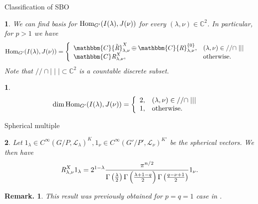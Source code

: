 \documentclass[8pt,notes,notheorems]{beamer}
\newcommand{\Hom}{\mbox{\normalfont Hom}}
\newcommand{\OpR}{\mbox{\it R}}
\newtheorem{theorem}{\translate{Theorem}}[section]
\newtheorem{theorem}{\translate{Theorem}}
\newtheorem{corollary}{\translate{Corollary}}
\theoremstyle{definition}
\theoremstyle{example}
\theoremstyle{plain}
\theoremstyle{mystyle}
\newtheorem*{remark}{Remark.}
\begin{document}
\begin{frame}{Classification of SBO}
	\begin{theorem}
		We can find basis for $\Hom_{G'}(I(\lambda),J(\nu))$ for every $(\lambda,\nu)\in \mathbb{C}^2$. In particular, for $p>1$ we have
  \begin{eqnarray}
	  & \Hom_{G'}(I(\lambda),J(\nu))= \left\{
    \begin{array}{ll}
	    \mathbbm{C} {\tilde{\OpR}}_{\lambda, \nu}^{X} \oplus \mathbbm{C}
      {\OpR}^{\{ 0 \}}_{\lambda, \nu}, & (\lambda, \nu) \in / /\cap 
      \mid\mid\mid \\
      \mathbbm{C} \OpR^X_{\lambda, \nu}, &
      \mbox{\normalfont otherwise.}
    \end{array} \right. &  \nonumber
  \end{eqnarray}
  Note that $//\cap\mid\mid\mid\subset\mathbb{C}^2$ is a countable discrete subset.
		\label{}
	\end{theorem}
	\begin{corollary}
  \begin{eqnarray}
	  & \dim\Hom_{G'}(I(\lambda),J(\nu))= \left\{
    \begin{array}{ll}
	    2, & (\lambda, \nu) \in / /\cap 
      \mid\mid\mid \\
      1, &
      \mbox{\normalfont otherwise.}
    \end{array} \right. &  \nonumber
  \end{eqnarray}
	\end{corollary}
\end{frame}
\begin{frame}{Spherical multiple}
	\begin{theorem}
		Let $1_\lambda\in C^\infty(G/P,\mathcal{L}_\lambda)^K,1_\nu\in C^\infty(G'/P',\mathcal{L}_\nu)^{K'}$ be the spherical vectors. We then have
	\[ \OpR^X_{\lambda, \nu} 1_{\lambda} = 2^{1 -
     \lambda} \frac{\pi^{n / 2}}{\Gamma \left( \frac{\lambda}{2} \right)
     \Gamma \left(  \frac{\lambda + 1-q}{2} \right) \Gamma \left(
     \frac{q - \nu + 1}{2} \right)} 1_{\nu}. \]
	\end{theorem}
	\begin{remark}
		This result was previously obtained for $p=q=1$ case in \cite{bernstein2004estimates}.
	\end{remark}
\end{frame}
\end{document}
